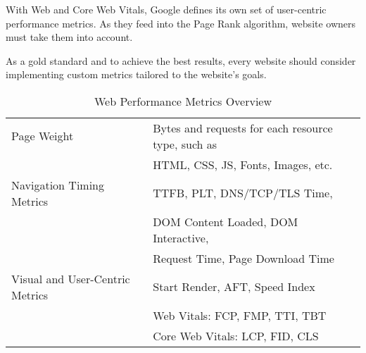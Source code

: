 With Web and Core Web Vitals, Google defines its own set of user-centric performance metrics.
As they feed into the Page Rank algorithm, website owners must take them into account.

As a gold standard and to achieve the best results, every website should consider implementing custom metrics tailored to the website's goals.


\begin{table}[h]
	\small
	\centering
	\begin{tabular}{ | l | l | }
	\hline
	Page Weight & Bytes and requests for each resource type, such as \\
	& HTML, CSS, JS, Fonts, Images, etc. \\
	\hline
	Navigation Timing Metrics & TTFB, PLT, DNS/TCP/TLS Time, \\
	& DOM Content Loaded, DOM Interactive, \\
	& Request Time, Page Download Time \\
	\hline
	Visual and User-Centric Metrics & Start Render, AFT, Speed Index \\
	& Web Vitals: FCP, FMP, TTI, TBT \\
	& Core Web Vitals: LCP, FID, CLS \\
	\hline
	\end{tabular}
	\medskip
	\caption{Web Performance Metrics Overview}
	\label{table:performance_metrics_conclusion}
\end{table}










